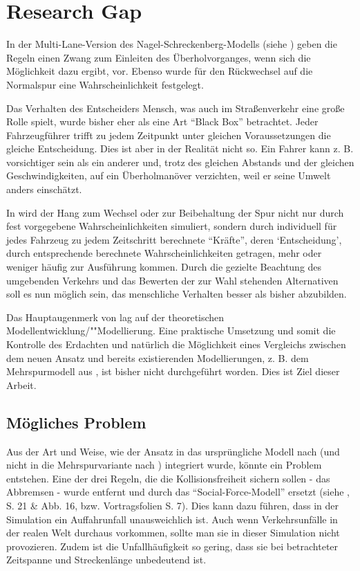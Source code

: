 \section{Research Gap}
\label{sec:researchgap}

In der Multi-Lane-Version des Nagel-Schreckenberg-Modells (siehe \cite{multi-lane}) geben die Regeln einen Zwang zum Einleiten des Überholvorganges, wenn sich die Möglichkeit dazu ergibt, vor. Ebenso wurde für den Rückwechsel auf die Normalspur eine Wahrscheinlichkeit festgelegt.

Das Verhalten des Entscheiders Mensch, was auch im Straßenverkehr eine große Rolle spielt, wurde bisher eher als eine Art \enquote{Black Box} betrachtet. 
Jeder Fahrzeugführer trifft zu jedem Zeitpunkt unter gleichen Voraussetzungen die gleiche Entscheidung. 
Dies ist aber in der Realität nicht so. 
Ein Fahrer kann z. B. vorsichtiger sein als ein anderer und, trotz des gleichen Abstands und der gleichen Geschwindigkeiten, auf ein Überholmanöver verzichten, weil er seine Umwelt anders einschätzt.

In \cite{dat-ba} wird der Hang zum Wechsel oder zur Beibehaltung der Spur nicht nur durch fest vorgegebene Wahrscheinlichkeiten simuliert, sondern durch individuell für jedes Fahrzeug zu jedem Zeitschritt berechnete \enquote{Kräfte}, deren \enquote*{Entscheidung}, durch entsprechende berechnete Wahrscheinlichkeiten getragen, mehr oder weniger häufig zur Ausführung kommen. 
Durch die gezielte Beachtung des umgebenden Verkehrs und das Bewerten der zur Wahl stehenden Alternativen soll es nun möglich sein, das menschliche Verhalten besser als bisher abzubilden.

Das Hauptaugenmerk von \cite{dat-ba} lag auf der theoretischen Modellentwicklung/""Modellierung. 
Eine praktische Umsetzung und somit die Kontrolle des Erdachten und natürlich die Möglichkeit eines Vergleichs zwischen dem neuen Ansatz und bereits existierenden Modellierungen, z. B. dem Mehrspurmodell aus \cite{multi-lane}, ist bisher nicht durchgeführt worden. 
Dies ist Ziel dieser Arbeit.

\subsection*{Mögliches Problem}

Aus der Art und Weise, wie der Ansatz in das ursprüngliche Modell nach \cite{na-sch} (und nicht in die Mehrspurvariante nach \cite{multi-lane}) integriert wurde, könnte ein Problem entstehen.
Eine der drei Regeln, die die Kollisionsfreiheit sichern sollen - das Abbremsen - wurde entfernt und durch das \enquote{Social-Force-Modell} ersetzt (siehe \cite{dat-ba}, S. 21 \& Abb. 16, bzw. Vortragsfolien S. 7).
Dies kann dazu führen, dass in der Simulation ein Auffahrunfall unausweichlich ist.
Auch wenn Verkehrsunfälle in der realen Welt durchaus vorkommen, sollte man sie in dieser Simulation nicht provozieren. Zudem ist die Unfallhäufigkeit so gering, dass sie bei betrachteter Zeitspanne und Streckenlänge unbedeutend ist.

